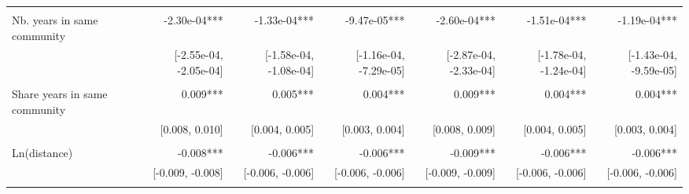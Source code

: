 \begin{table}[!h]
\begin{tabular}{lllllll}
\multicolumn{1}{l}{} &
  \multicolumn{1}{|r}{} &
  \multicolumn{1}{r}{} &
  \multicolumn{1}{r}{} &
  \multicolumn{1}{r}{} &
  \multicolumn{1}{r}{} &
  \multicolumn{1}{r}{} \\
\multicolumn{1}{l}{Nb. years in same community} &
  \multicolumn{1}{|r}{-2.30e-04***} &
  \multicolumn{1}{r}{-1.33e-04***} &
  \multicolumn{1}{r}{-9.47e-05***} &
  \multicolumn{1}{r}{-2.60e-04***} &
  \multicolumn{1}{r}{-1.51e-04***} &
  \multicolumn{1}{r}{-1.19e-04***} \\
\multicolumn{1}{l}{} &
  \multicolumn{1}{|r}{[-2.55e-04, -2.05e-04]} &
  \multicolumn{1}{r}{[-1.58e-04, -1.08e-04]} &
  \multicolumn{1}{r}{[-1.16e-04, -7.29e-05]} &
  \multicolumn{1}{r}{[-2.87e-04, -2.33e-04]} &
  \multicolumn{1}{r}{[-1.78e-04, -1.24e-04]} &
  \multicolumn{1}{r}{[-1.43e-04, -9.59e-05]} \\
\multicolumn{1}{l}{} &
  \multicolumn{1}{|r}{} &
  \multicolumn{1}{r}{} &
  \multicolumn{1}{r}{} &
  \multicolumn{1}{r}{} &
  \multicolumn{1}{r}{} &
  \multicolumn{1}{r}{} \\
\multicolumn{1}{l}{Share years in same community} &
  \multicolumn{1}{|r}{0.009***} &
  \multicolumn{1}{r}{0.005***} &
  \multicolumn{1}{r}{0.004***} &
  \multicolumn{1}{r}{0.009***} &
  \multicolumn{1}{r}{0.004***} &
  \multicolumn{1}{r}{0.004***} \\
\multicolumn{1}{l}{} &
  \multicolumn{1}{|r}{[0.008,   0.010]} &
  \multicolumn{1}{r}{[0.004,   0.005]} &
  \multicolumn{1}{r}{[0.003,   0.004]} &
  \multicolumn{1}{r}{[0.008,   0.009]} &
  \multicolumn{1}{r}{[0.004,   0.005]} &
  \multicolumn{1}{r}{[0.003,   0.004]} \\
\multicolumn{1}{l}{} &
  \multicolumn{1}{|r}{} &
  \multicolumn{1}{r}{} &
  \multicolumn{1}{r}{} &
  \multicolumn{1}{r}{} &
  \multicolumn{1}{r}{} &
  \multicolumn{1}{r}{} \\
\multicolumn{1}{l}{Ln(distance)} &
  \multicolumn{1}{|r}{-0.008***} &
  \multicolumn{1}{r}{-0.006***} &
  \multicolumn{1}{r}{-0.006***} &
  \multicolumn{1}{r}{-0.009***} &
  \multicolumn{1}{r}{-0.006***} &
  \multicolumn{1}{r}{-0.006***} \\
\multicolumn{1}{l}{} &
  \multicolumn{1}{|r}{[-0.009,  -0.008]} &
  \multicolumn{1}{r}{[-0.006,  -0.006]} &
  \multicolumn{1}{r}{[-0.006,  -0.006]} &
  \multicolumn{1}{r}{[-0.009,  -0.009]} &
  \multicolumn{1}{r}{[-0.006,  -0.006]} &
  \multicolumn{1}{r}{[-0.006,  -0.006]} \\
\multicolumn{1}{l}{} &
  \multicolumn{1}{|r}{} &
  \multicolumn{1}{r}{} &
  \multicolumn{1}{r}{} &

\end{tabular}
\end{table}
